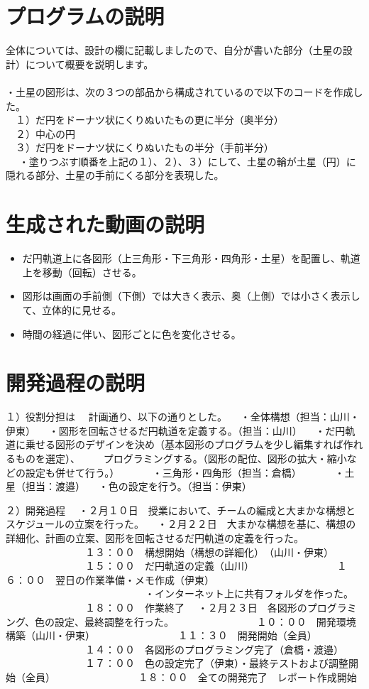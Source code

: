 \documentclass[12pt,a4j]{jarticle}
\begin{document}
\section{プログラムの説明}

全体については、設計の欄に記載しましたので、自分が書いた部分（土星の設計）について概要を説明します。\\
\\
・土星の図形は、次の３つの部品から構成されているので以下のコードを作成した。\\
　１）だ円をドーナツ状にくりぬいたもの更に半分（奥半分）\\
　２）中心の円　\\
　３）だ円をドーナツ状にくりぬいたもの半分（手前半分）\\　
・塗りつぶす順番を上記の１）、２）、３）にして、土星の輪が土星（円）に隠れる部分、土星の手前にくる部分を表現した。\\

\section{生成された動画の説明}
\begin{itemize}
  \item だ円軌道上に各図形（上三角形・下三角形・四角形・土星）を配置し、軌道上を移動（回転）させる。
  \item 図形は画面の手前側（下側）では大きく表示、奥（上側）では小さく表示して、立体的に見せる。
  \item 時間の経過に伴い、図形ごとに色を変化させる。
\end{itemize}

\section{開発過程の説明}

１）役割分担は
　計画通り、以下の通りとした。
　・全体構想（担当：山川・伊東）
　・図形を回転させるだ円軌道を定義する。（担当：山川）
　・だ円軌道に乗せる図形のデザインを決め（基本図形のプログラムを少し編集すれば作れるものを選定）、
　　プログラミングする。（図形の配位、図形の拡大・縮小などの設定も併せて行う。）
　　　・三角形・四角形（担当：倉橋）
　　　・土星（担当：渡邉）
　・色の設定を行う。（担当：伊東）

２）開発過程
　・２月１０日　授業において、チームの編成と大まかな構想とスケジュールの立案を行った。
　・２月２２日　大まかな構想を基に、構想の詳細化、計画の立案、図形を回転させるだ円軌道の定義を行った。
　　　　　　　　１３：００　構想開始（構想の詳細化）　（山川・伊東）
　　　　　　　　１５：００　だ円軌道の定義（山川）
　　　　　　　　１６：００　翌日の作業準備・メモ作成（伊東）
　　　　　　　　　　　　　　・インターネット上に共有フォルダを作った。
　　　　　　　　１８：００　作業終了
　・２月２３日　各図形のプログラミング、色の設定、最終調整を行った。
　　　　　　　　１０：００　開発環境構築（山川・伊東）
　　　　　　　　１１：３０　開発開始（全員）
　　　　　　　　１４：００　各図形のプログラミング完了（倉橋・渡邉）
　　　　　　　　１７：００　色の設定完了（伊東）・最終テストおよび調整開始（全員）
　　　　　　　　１８：００　全ての開発完了　レポート作成開始
\end{document}
